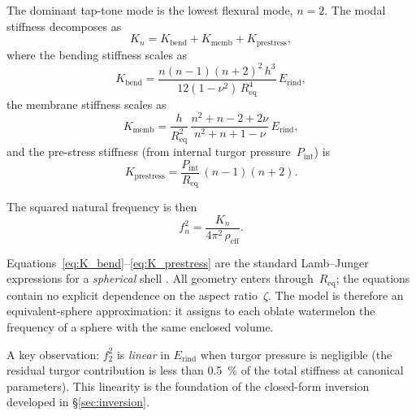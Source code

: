 The dominant tap-tone mode is the lowest flexural mode, $n = 2$.  The
modal stiffness decomposes as
\begin{equation}
  K_n = K_{\mathrm{bend}} + K_{\mathrm{memb}} + K_{\mathrm{prestress}},
  \label{eq:stiffness_decomp}
\end{equation}
where the bending stiffness scales as
\begin{equation}
  K_{\mathrm{bend}} = \frac{n(n-1)(n+2)^2\, h^3}
    {12(1-\nu^2)\, R_{\mathrm{eq}}^4}\, E_{\mathrm{rind}},
  \label{eq:K_bend}
\end{equation}
the membrane stiffness scales as
\begin{equation}
  K_{\mathrm{memb}} = \frac{h}{R_{\mathrm{eq}}^2}\,
    \frac{n^2 + n - 2 + 2\nu}{n^2 + n + 1 - \nu}\,
    E_{\mathrm{rind}},
  \label{eq:K_memb}
\end{equation}
and the pre-stress stiffness (from internal turgor pressure~$P_{\mathrm{int}}$) is
\begin{equation}
  K_{\mathrm{prestress}} = \frac{P_{\mathrm{int}}}{R_{\mathrm{eq}}}
    \, (n-1)(n+2).
  \label{eq:K_prestress}
\end{equation}

The squared natural frequency is then
\begin{equation}
  f_n^2 = \frac{K_n}{4\pi^2\, \rho_{\mathrm{eff}}}.
  \label{eq:f2_squared}
\end{equation}

\noindent
Equations~\eqref{eq:K_bend}--\eqref{eq:K_prestress} are the standard
Lamb--Junger expressions for a \emph{spherical} shell
\cite{lamb1882, Junger1986, Leissa1973, Soedel2004}.  All geometry
enters through~$R_{\mathrm{eq}}$; the equations contain no explicit
dependence on the aspect ratio~$\zeta$.  The model is therefore an
equivalent-sphere approximation: it assigns to each oblate watermelon
the frequency of a sphere with the same enclosed volume.

\noindent A key observation: $f_2^2$ is \emph{linear} in
$E_{\mathrm{rind}}$ when turgor pressure is negligible (the residual
turgor contribution is less than \SI{0.5}{\percent} of the total
stiffness at canonical parameters).  This linearity
is the foundation of the closed-form inversion developed in
\S\ref{sec:inversion}.

